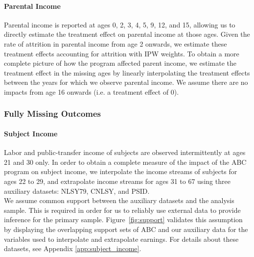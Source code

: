 \paragraph{Parental Income}

\noindent Parental income is reported at ages 0, 2, 3, 4, 5, 9, 12, and 15, allowing us to directly estimate
the treatment effect on parental income at those ages. Given the rate of attrition in
parental income from age 2 onwards, we estimate these treatment effects accounting for attrition
with IPW weights.
To obtain a more complete picture of how the
program affected parent income, we estimate the treatment effect in the missing ages by linearly
interpolating the treatment effects between the years for which we observe parental income. We assume
there are no impacts from age 16 onwards (i.e. a treatment effect of 0). \\


\subsubsection{Fully Missing Outcomes}
\label{app:method_noobs}

\paragraph{Subject Income}

\noindent Labor and public-transfer income of subjects are observed intermittently at ages 21 and 30 only. In order
to obtain a complete measure of the impact of the ABC program on subject income, we interpolate
the income streams of subjects for ages 22 to 29, and extrapolate income streams for ages
31 to 67 using three auxiliary datasets: NLSY79, CNLSY, and PSID. \\

\noindent We assume common support between the auxiliary
datasets and the analysis sample. This is required in order for us to reliably use external data to provide inference for the primary sample. Figure~\ref{fig:support} validates this
assumption by displaying the overlapping support sets of ABC and our auxiliary data for
the variables used to interpolate and extrapolate earnings. For details about these datasets, see Appendix \ref{app:subject_income}. \\


